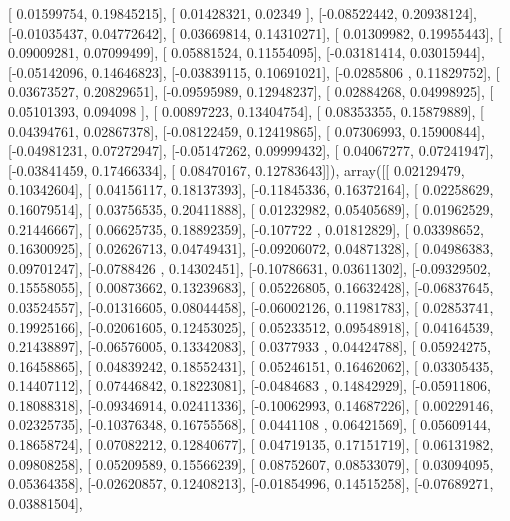\documentclass{article}
\begin{document}
       [ 0.01599754,  0.19845215],
       [ 0.01428321,  0.02349   ],
       [-0.08522442,  0.20938124],
       [-0.01035437,  0.04772642],
       [ 0.03669814,  0.14310271],
       [ 0.01309982,  0.19955443],
       [ 0.09009281,  0.07099499],
       [ 0.05881524,  0.11554095],
       [-0.03181414,  0.03015944],
       [-0.05142096,  0.14646823],
       [-0.03839115,  0.10691021],
       [-0.0285806 ,  0.11829752],
       [ 0.03673527,  0.20829651],
       [-0.09595989,  0.12948237],
       [ 0.02884268,  0.04998925],
       [ 0.05101393,  0.094098  ],
       [ 0.00897223,  0.13404754],
       [ 0.08353355,  0.15879889],
       [ 0.04394761,  0.02867378],
       [-0.08122459,  0.12419865],
       [ 0.07306993,  0.15900844],
       [-0.04981231,  0.07272947],
       [-0.05147262,  0.09999432],
       [ 0.04067277,  0.07241947],
       [-0.03841459,  0.17466334],
       [ 0.08470167,  0.12783643]]), array([[ 0.02129479,  0.10342604],
       [ 0.04156117,  0.18137393],
       [-0.11845336,  0.16372164],
       [ 0.02258629,  0.16079514],
       [ 0.03756535,  0.20411888],
       [ 0.01232982,  0.05405689],
       [ 0.01962529,  0.21446667],
       [ 0.06625735,  0.18892359],
       [-0.107722  ,  0.01812829],
       [ 0.03398652,  0.16300925],
       [ 0.02626713,  0.04749431],
       [-0.09206072,  0.04871328],
       [ 0.04986383,  0.09701247],
       [-0.0788426 ,  0.14302451],
       [-0.10786631,  0.03611302],
       [-0.09329502,  0.15558055],
       [ 0.00873662,  0.13239683],
       [ 0.05226805,  0.16632428],
       [-0.06837645,  0.03524557],
       [-0.01316605,  0.08044458],
       [-0.06002126,  0.11981783],
       [ 0.02853741,  0.19925166],
       [-0.02061605,  0.12453025],
       [ 0.05233512,  0.09548918],
       [ 0.04164539,  0.21438897],
       [-0.06576005,  0.13342083],
       [ 0.0377933 ,  0.04424788],
       [ 0.05924275,  0.16458865],
       [ 0.04839242,  0.18552431],
       [ 0.05246151,  0.16462062],
       [ 0.03305435,  0.14407112],
       [ 0.07446842,  0.18223081],
       [-0.0484683 ,  0.14842929],
       [-0.05911806,  0.18088318],
       [-0.09346914,  0.02411336],
       [-0.10062993,  0.14687226],
       [ 0.00229146,  0.02325735],
       [-0.10376348,  0.16755568],
       [ 0.0441108 ,  0.06421569],
       [ 0.05609144,  0.18658724],
       [ 0.07082212,  0.12840677],
       [ 0.04719135,  0.17151719],
       [ 0.06131982,  0.09808258],
       [ 0.05209589,  0.15566239],
       [ 0.08752607,  0.08533079],
       [ 0.03094095,  0.05364358],
       [-0.02620857,  0.12408213],
       [-0.01854996,  0.14515258],
       [-0.07689271,  0.03881504],
\end{document}
